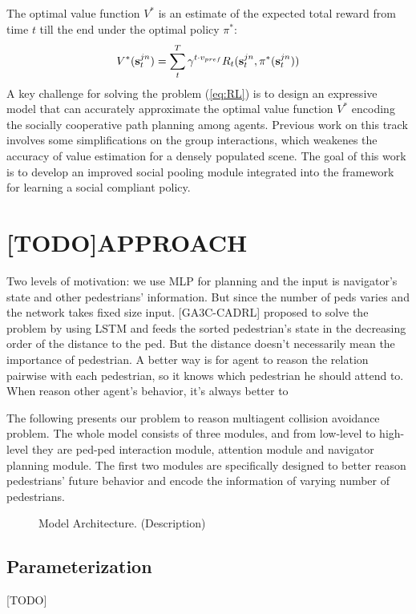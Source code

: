 \documentclass[letterpaper, 10 pt, conference]{ieeeconf}  %
\begin{document}
The optimal value function $V^*$ is an estimate of the expected total reward from time $t$ till the end under the optimal policy $\pi^*$: 
\begin{equation}
V^*(\bold{s}_t^{jn}) = \sum_{t}^T \gamma^{t \cdot v_{pref}} R_t(\bold{s}_t^{jn},\pi^*(\bold{s}_t^{jn}))
\end{equation}
A key challenge for solving the problem (\ref{eq:RL}) is to design an expressive model that can accurately approximate the optimal value function $V^{*}$ encoding the socially cooperative path planning among agents. Previous work on this track involves some simplifications on the group interactions, which weakenes the accuracy of value estimation for a densely populated scene. The goal of this work is to develop an improved social pooling module integrated into the framework for learning a social compliant policy. 

\section{[TODO]APPROACH} \label{sec:approach} 
Two levels of motivation: we use MLP for planning and the input is navigator's state and other pedestrians' information. But since the number of peds varies and the network takes fixed size input. [GA3C-CADRL] proposed to solve the problem by using LSTM and feeds the sorted pedestrian's state in the decreasing order of the distance to the ped. But the distance doesn't necessarily mean the importance of pedestrian. A better way is for agent to reason the relation pairwise with each pedestrian, so it knows which pedestrian he should attend to. When reason other agent's behavior, it's always better to  

The following presents our problem to reason multiagent collision avoidance problem. The whole model consists of three modules, and from low-level to high-level they are ped-ped interaction module, attention module and navigator planning module. The first two modules are specifically designed to better reason pedestrians' future behavior and encode the information of varying number of pedestrians.

\begin{figure}[thpb]
  \centering
  \caption{Model Architecture. (Description)}
  \label{figurelabel}
\end{figure}

\subsection{Parameterization}
[TODO]
\end{document}
